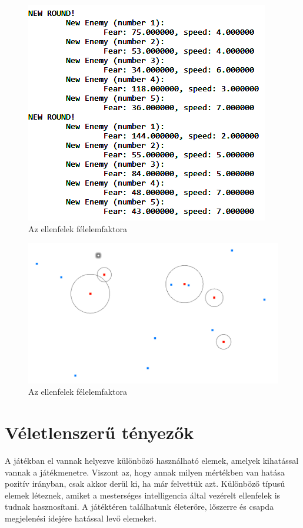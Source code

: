 \begin{figure}[h]
\centering
\includegraphics[scale=0.8]{kepek/anim_random_values.png}
\caption{Az ellenfelek félelemfaktora}
\label{fig:behavior_settings}
\end{figure}

\begin{figure}[h]
\centering
\includegraphics[scale=0.4]{kepek/behavior_demo.png}
\caption{Az ellenfelek félelemfaktora}
\label{fig:behavior_demo}
\end{figure}

\section{Véletlenszerű tényezők}

A játékban el vannak helyezve különböző használható elemek, amelyek kihatással vannak a játékmenetre. Viszont az, hogy annak milyen mértékben van hatása pozitív irányban, csak akkor derül ki, ha már felvettük azt. Különböző típusú elemek léteznek, amiket a mesterséges intelligencia által vezérelt ellenfelek is tudnak hasznosítani. A játéktéren találhatunk életerőre, lőszerre és csapda megjelenési idejére hatással levő elemeket.

